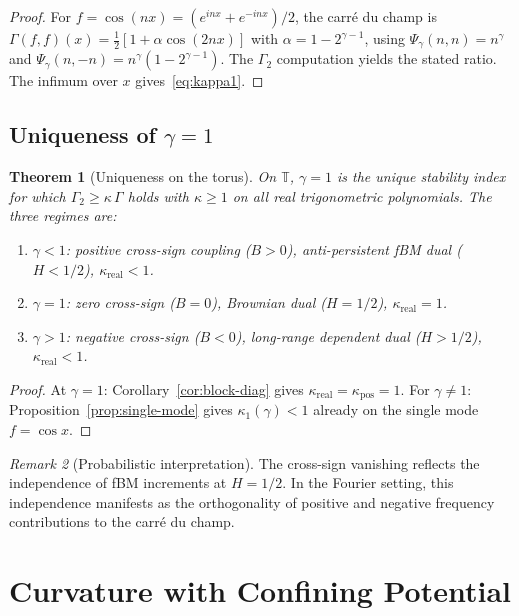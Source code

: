\documentclass[11pt,a4paper]{article}
\theoremstyle{plain}
\newtheorem{theorem}{Theorem}[section]
\theoremstyle{definition}
\theoremstyle{remark}
\newtheorem{remark}[theorem]{Remark}
\newcommand{\T}{\mathbb{T}}
\begin{document}
\begin{proof}
For $f = \cos(nx) = (e^{inx} + e^{-inx})/2$, the carr\'e du champ is
$\Gamma(f,f)(x) = \tfrac{1}{2}[1 + \alpha\cos(2nx)]$
with $\alpha = 1 - 2^{\gamma-1}$,
using $\Psi_\gamma(n,n) = n^\gamma$ and
$\Psi_\gamma(n,-n) = n^\gamma(1 - 2^{\gamma-1})$.
The $\Gamma_2$ computation yields the stated ratio.
The infimum over $x$ gives~\eqref{eq:kappa1}.
\end{proof}


\subsection{Uniqueness of $\gamma = 1$}

\begin{theorem}[Uniqueness on the torus]\label{thm:uniqueness}
On $\T$, $\gamma = 1$ is the unique stability index for which
$\Gamma_2 \geq \kappa\,\Gamma$ holds with $\kappa \geq 1$
on all real trigonometric polynomials. The three regimes are:
\begin{enumerate}[label=(\roman*)]
\item $\gamma < 1$: positive cross-sign coupling ($B > 0$),
  anti-persistent fBM dual ($H < 1/2$), $\kappa_{\mathrm{real}} < 1$.
\item $\gamma = 1$: zero cross-sign ($B = 0$),
  Brownian dual ($H = 1/2$), $\kappa_{\mathrm{real}} = 1$.
\item $\gamma > 1$: negative cross-sign ($B < 0$),
  long-range dependent dual ($H > 1/2$), $\kappa_{\mathrm{real}} < 1$.
\end{enumerate}
\end{theorem}

\begin{proof}
At $\gamma = 1$: Corollary~\ref{cor:block-diag} gives
$\kappa_{\mathrm{real}} = \kappa_{\mathrm{pos}} = 1$.
For $\gamma \neq 1$: Proposition~\ref{prop:single-mode} gives
$\kappa_1(\gamma) < 1$ already on the single mode $f = \cos x$.
\end{proof}

\begin{remark}[Probabilistic interpretation]
The cross-sign vanishing reflects the independence of fBM increments
at $H = 1/2$. In the Fourier setting, this independence manifests as
the orthogonality of positive and negative frequency contributions
to the carr\'e du champ.
\end{remark}


\section{Curvature with Confining Potential}\label{sec:potential}
\end{document}
